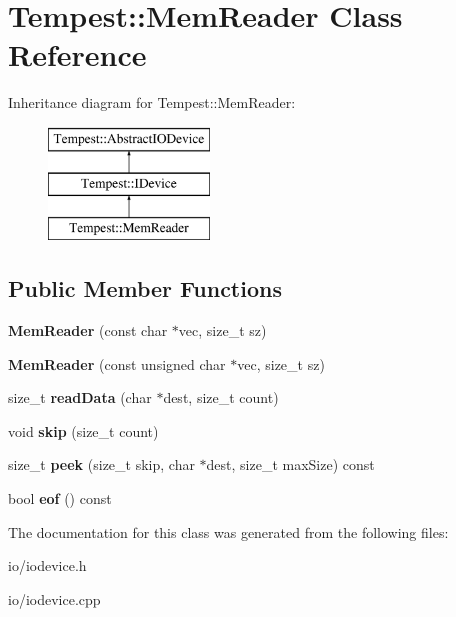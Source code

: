 \hypertarget{class_tempest_1_1_mem_reader}{\section{Tempest\+:\+:Mem\+Reader Class Reference}
\label{class_tempest_1_1_mem_reader}
}
Inheritance diagram for Tempest\+:\+:Mem\+Reader\+:\begin{figure}[H]
\begin{center}
\leavevmode
\includegraphics[height=3.000000cm]{class_tempest_1_1_mem_reader}
\end{center}
\end{figure}
\subsection*{Public Member Functions}
\begin{DoxyCompactItemize}
\item 
\hypertarget{class_tempest_1_1_mem_reader_a5ea44a6eff56704e0937b0f2540d6b65}{{\bfseries Mem\+Reader} (const char $\ast$vec, size\+\_\+t sz)}\label{class_tempest_1_1_mem_reader_a5ea44a6eff56704e0937b0f2540d6b65}

\item 
\hypertarget{class_tempest_1_1_mem_reader_a1f2743b231559fdc78507abc25c1a000}{{\bfseries Mem\+Reader} (const unsigned char $\ast$vec, size\+\_\+t sz)}\label{class_tempest_1_1_mem_reader_a1f2743b231559fdc78507abc25c1a000}

\item 
\hypertarget{class_tempest_1_1_mem_reader_a46a63d15825afb571e8157fa66e56042}{size\+\_\+t {\bfseries read\+Data} (char $\ast$dest, size\+\_\+t count)}\label{class_tempest_1_1_mem_reader_a46a63d15825afb571e8157fa66e56042}

\item 
\hypertarget{class_tempest_1_1_mem_reader_a69f8d7f1e781eb515d9c086c853e27ee}{void {\bfseries skip} (size\+\_\+t count)}\label{class_tempest_1_1_mem_reader_a69f8d7f1e781eb515d9c086c853e27ee}

\item 
\hypertarget{class_tempest_1_1_mem_reader_af575d206987831959046e9a376b0d8ec}{size\+\_\+t {\bfseries peek} (size\+\_\+t skip, char $\ast$dest, size\+\_\+t max\+Size) const }\label{class_tempest_1_1_mem_reader_af575d206987831959046e9a376b0d8ec}

\item 
\hypertarget{class_tempest_1_1_mem_reader_a1fc57bef6b6abdececec8334b04b9121}{bool {\bfseries eof} () const }\label{class_tempest_1_1_mem_reader_a1fc57bef6b6abdececec8334b04b9121}

\end{DoxyCompactItemize}


The documentation for this class was generated from the following files\+:\begin{DoxyCompactItemize}
\item 
io/iodevice.\+h\item 
io/iodevice.\+cpp\end{DoxyCompactItemize}
